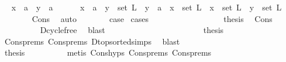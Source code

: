 \begin{isabellebody}
\ \isamarkupfalse%
\ {\isachardoublequoteopen}x\ {\isacharequal}{\kern0pt}\ a\ {\isasymand}\ y\ {\isacharequal}{\kern0pt}\ a{\isachardoublequoteclose}\isanewline
\ \ \ \ \ \ {\isacharbar}{\kern0pt}{\isachardoublequoteopen}x\ {\isacharequal}{\kern0pt}\ a\ {\isasymand}\ y\ {\isasymin}\ set\ L{\isachardoublequoteclose}\ {\isacharbar}{\kern0pt}\ {\isachardoublequoteopen}y\ {\isacharequal}{\kern0pt}\ a\ {\isasymand}\ x\ {\isasymin}\ set\ L{\isachardoublequoteclose}\ {\isacharbar}{\kern0pt}\ {\isachardoublequoteopen}x\ {\isasymin}\ set\ L\ {\isasymand}\ y\ {\isasymin}\ set\ L{\isachardoublequoteclose}\isanewline
\ \ \ \ \ \ \isamarkupfalse%
\ Cons\ \isamarkupfalse%
\ auto\isanewline
\ \ \ \ \isamarkupfalse%
\ \isamarkupfalse%
\ {\isacharquery}{\kern0pt}case\ \isamarkupfalse%
{\isacharparenleft}{\kern0pt}cases{\isacharparenright}{\kern0pt}\isanewline
\ \ \ \ \ \ \isamarkupfalse%
\ {}\isanewline
\ \ \ \ \ \ \isamarkupfalse%
\ \isamarkupfalse%
\ {\isacharquery}{\kern0pt}thesis\ \isamarkupfalse%
\ Cons\isanewline
\ \ \ \ \ \ \ \ \isamarkupfalse%
\ D{\isachardot}{\kern0pt}cycle{\isacharunderscore}{\kern0pt}free\ \isamarkupfalse%
\ blast\ \isanewline
\ \ \ \ \isamarkupfalse%
\isanewline
\ \ \ \ \ \ \isamarkupfalse%
\ {}\isanewline
\ \ \ \ \ \ \isamarkupfalse%
\ \isamarkupfalse%
\ {\isacharquery}{\kern0pt}thesis\isanewline
\ \ \ \ \ \ \ \ \isamarkupfalse%
\ Cons{\isachardot}{\kern0pt}prems{\isacharparenleft}{\kern0pt}{}{\isacharparenright}{\kern0pt}\ Cons{\isachardot}{\kern0pt}prems{\isacharparenleft}{\kern0pt}{}{\isacharparenright}{\kern0pt}\ D{\isachardot}{\kern0pt}top{\isacharunderscore}{\kern0pt}sorted{\isachardot}{\kern0pt}simps{\isacharparenleft}{\kern0pt}{}{\isacharparenright}{\kern0pt}\ \isamarkupfalse%
\ blast\ \isanewline
\ \ \ \ \isamarkupfalse%
\isanewline
\ \ \ \ \ \ \isamarkupfalse%
\ {}\isanewline
\ \ \ \ \ \ \isamarkupfalse%
\ \isamarkupfalse%
\ {\isacharquery}{\kern0pt}thesis\isanewline
\ \ \ \ \ \ \ \ \isamarkupfalse%
\ {\isacharparenleft}{\kern0pt}metis\ Cons{\isachardot}{\kern0pt}hyps\ Cons{\isachardot}{\kern0pt}prems{\isacharparenleft}{\kern0pt}{}{\isacharparenright}{\kern0pt}\ Cons{\isachardot}{\kern0pt}prems{\isacharparenleft}{\kern0pt}{}{\isacharparenright}{\kern0pt}\isanewline

\end{isabellebody}
